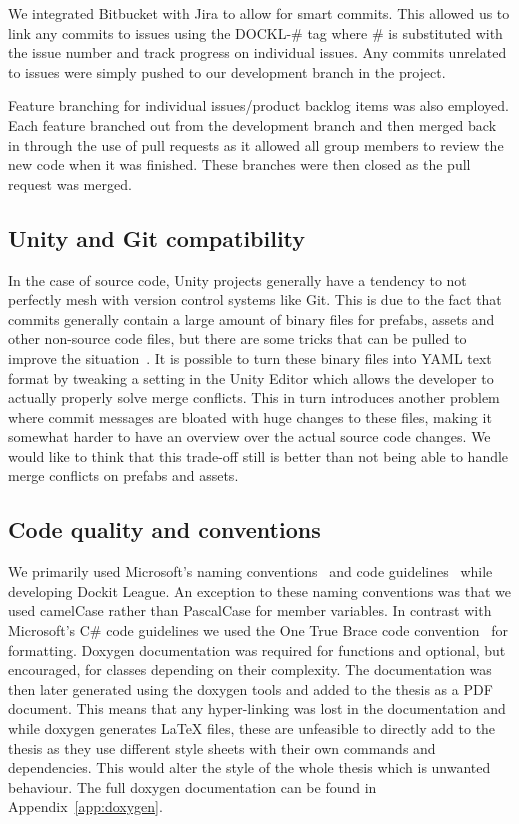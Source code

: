 We integrated Bitbucket with Jira to allow for smart commits. This allowed us to link any commits to issues using the DOCKL-\# tag where \# is substituted with the issue number and track progress on individual issues. Any commits unrelated to issues were simply pushed to our development branch in the project. 
    
Feature branching for individual issues/product backlog items was also employed. Each feature branched out from the development branch and then merged back in through the use of pull requests as it allowed all group members to review the new code when it was finished. These branches were then closed as the pull request was merged. 

\subsection{Unity and Git compatibility}
\label{sec:unityGit}
In the case of source code, Unity projects generally have a tendency to not perfectly mesh with version control systems like Git. This is due to the fact that commits generally contain a large amount of binary files for prefabs, assets and other non-source code files, but there are some tricks that can be pulled to improve the situation~\cite{unityGit}. It is possible to turn these binary files into YAML text format by tweaking a setting in the Unity Editor which allows the developer to actually properly solve merge conflicts. This in turn introduces another problem where commit messages are bloated with huge changes to these files, making it somewhat harder to have an overview over the actual source code changes. We would like to think that this trade-off still is better than not being able to handle merge conflicts on prefabs and assets. 

\subsection{Code quality and conventions}
We primarily used Microsoft's naming conventions~\cite{microsoftNamingGuidelines} and code guidelines~\cite{microsoftCodeGuidelines} while developing Dockit League. An exception to these naming conventions was that we used camelCase rather than PascalCase for member variables. In contrast with Microsoft's C\# code guidelines we used the One True Brace code convention~\cite{oneTrueBraceStyle} for formatting. 
Doxygen documentation was required for functions and optional, but encouraged, for classes depending on their complexity. The documentation was then later generated using the doxygen tools and added to the thesis as a PDF document. This means that any hyper-linking was lost in the documentation and while doxygen generates LaTeX files, these are unfeasible to directly add to the thesis as they use different style sheets with their own commands and dependencies. This would alter the style of the whole thesis which is unwanted behaviour. The full doxygen documentation can be found in Appendix~\ref{app:doxygen}. 

